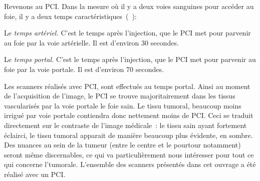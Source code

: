 \documentclass[main.tex]{subfiles}
\begin{document}
Revenons au PCI. Dans la mesure où il y a deux voies sanguines pour accéder au foie, il y a deux temps caractéristiques~(\cf~\cite{kim2014ct,ichikawa2006multiphasic}):
\begin{myitemize}
\item Le \emph{temps artériel.} C'est le temps après l'injection, que le PCI met pour parvenir au foie par la voie artérielle. Il est d'environ 30 secondes.
\item Le \emph{temps portal.} C'est le temps après l'injection, que le PCI met pour parvenir au foie par la voie portale. Il est d'environ 70 secondes. 
\end{myitemize}
Les scanners réalisés avec PCI, sont effectués au temps portal. Ainsi au moment de l'acquisition de l'image, le PCI se trouve majoritairement dans les tissus vascularisés par la voie portale \ie le foie sain. Le tissu tumoral, beaucoup moins irrigué par voie portale contiendra donc nettement moins de PCI. Ceci se traduit directement sur le contraste de l'image médicale~: le tissu sain ayant fortement éclairci, le tissu tumoral apparait de manière beaucoup plus évidente, en sombre. 
Des nuances au sein de la tumeur (entre le centre et le pourtour notamment) seront même discernables, ce qui va particulièrement nous intéresser pour tout ce qui concerne l'\hetero tumorale. L'ensemble des scanners présentés dans cet ouvrage a été réalisé avec un PCI.
\end{document}
